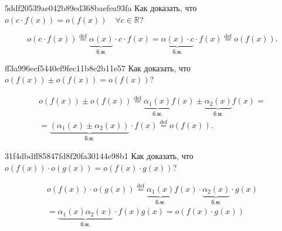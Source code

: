     \begin{note}{5ddf20539ae042b89ed368baefea93fa}
        Как доказать, что \( o(c \cdot f(x)) = o(f(x)) \quad \forall c \in \mathbb R \)?

        \begin{cloze}{1}
            \[
                o(c \cdot f(x)) \overset{\text{def}}= \underbrace{\alpha(x)}_{\text{б.м.}} \operatorname{\cdot} c \operatorname{\cdot} f(x)
                = \underbrace{\alpha(x) \operatorname{\cdot} c}_{\text{б.м.} } \operatorname{\cdot} f(x) \overset{\text{def}}= o(f(x)).
            \]
        \end{cloze}
    \end{note}

    \begin{note}{ff3a996ecf5440ef9fec11b8e2b11e57}
        Как доказать, что \( o(f(x)) \pm o(f(x)) = o(f(x)) \)?

        \begin{cloze}{1}
            \begin{multline*}
                o(f(x)) \pm o(f(x)) \overset{\text{def}}= \underbrace{\alpha_1(x)}_{\text{б.м.} }  f(x) \pm \underbrace{\alpha_2(x)}_{\text{б.м.} }  f(x) = \\
                = \underbrace{(\alpha_1(x) \pm \alpha_2(x))}_{\text{б.м.} }  \operatorname{\cdot} f(x) \overset{\text{def}}= o(f(x)).
            \end{multline*}
        \end{cloze}
    \end{note}

    \begin{note}{31f4dbdff85847fd8f20fa30144e98b1}
        Как доказать, что \( o(f(x)) \operatorname{\cdot} o(g(x)) = o(f(x) \operatorname{\cdot} g(x)) \)?

        \begin{cloze}{1}
            \begin{multline*}
                o(f(x)) \operatorname{\cdot} o(g(x)) \overset{\text{def}}= \underbrace{\alpha_1(x)}_{\text{б.м.} }  f(x) \operatorname{\cdot} \underbrace{\alpha_2(x)}_{\text{б.м.} }  \operatorname{\cdot} g(x) \\
                = \underbrace{\alpha_1(x)\alpha_2(x)}_{\text{б.м.}} \operatorname{\cdot} f(x)g(x) = o(f(x) \operatorname{\cdot} g(x))
            \end{multline*}
        \end{cloze}
    \end{note}

